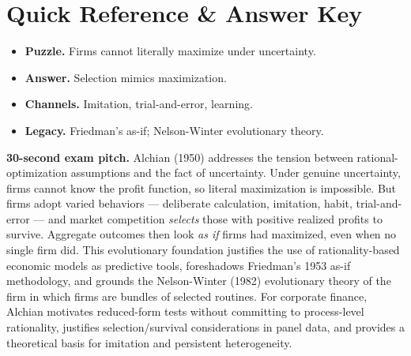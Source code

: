 \documentclass[11pt]{article}
\begin{document}
\section*{Quick Reference \& Answer Key}
\begin{answerbox}
\begin{itemize}
\item \textbf{Puzzle.} Firms cannot literally maximize under uncertainty.
\item \textbf{Answer.} Selection mimics maximization.
\item \textbf{Channels.} Imitation, trial-and-error, learning.
\item \textbf{Legacy.} Friedman's as-if; Nelson-Winter evolutionary theory.
\end{itemize}
\end{answerbox}

\begin{keybox}
\textbf{30-second exam pitch.} Alchian (1950) addresses the tension between rational-optimization assumptions and the fact of uncertainty. Under genuine uncertainty, firms cannot know the profit function, so literal maximization is impossible. But firms adopt varied behaviors --- deliberate calculation, imitation, habit, trial-and-error --- and market competition \emph{selects} those with positive realized profits to survive. Aggregate outcomes then look \emph{as if} firms had maximized, even when no single firm did. This evolutionary foundation justifies the use of rationality-based economic models as predictive tools, foreshadows Friedman's 1953 as-if methodology, and grounds the Nelson-Winter (1982) evolutionary theory of the firm in which firms are bundles of selected routines. For corporate finance, Alchian motivates reduced-form tests without committing to process-level rationality, justifies selection/survival considerations in panel data, and provides a theoretical basis for imitation and persistent heterogeneity.
\end{keybox}
\end{document}
